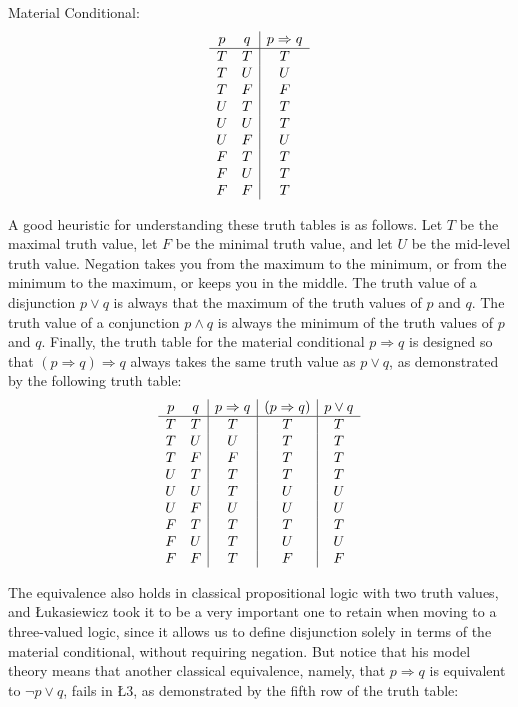 \documentclass[11pt]{article}
\theoremstyle{definition}
\theoremstyle{remark}
\begin{document}
\noindent
Material Conditional:
\[
\begin{array}{c c|c}
p & q & p \Rightarrow q \\
\hline
T & T & T \\
T & U & U \\
T & F & F \\
U & T & T \\
U & U & T \\
U & F & U \\
F & T & T \\
F & U & T \\
F & F & T \\
\end{array}
\]\par
\noindent
A good heuristic for understanding these truth tables is as follows. Let $T$ be the maximal truth value, let $F$ be the minimal truth value, and let $U$ be the mid-level truth value. Negation takes you from the maximum to the minimum, or from the minimum to the maximum, or keeps you in the middle. The truth value of a disjunction $p\vee q$ is always that the maximum of the truth values of $p$ and $q$. The truth value of a conjunction $p\wedge q$ is always the minimum of the truth values of $p$ and $q$. Finally, the truth table for the material conditional $p\Rightarrow q$ is designed so that $(p\Rightarrow q)\Rightarrow q$ always takes the same truth value as $p\vee q$, as demonstrated by the following truth table:
\noindent
\[
\begin{array}{c c|c|c|c}
p & q & p \Rightarrow q & (p \Rightarrow q) & p \lor q \\
\hline
T & T & T & T & T \\
T & U & U & T & T \\
T & F & F & T & T \\
U & T & T & T & T \\
U & U & T & U & U \\
U & F & U & U & U \\
F & T & T & T & T \\
F & U & T & U & U \\
F & F & T & F & F \\
\end{array}
\]\par
\noindent
The equivalence also holds in classical propositional logic with two truth values, and Łukasiewicz took it to be a very important one to retain when moving to a three-valued logic, since it allows us to define disjunction solely in terms of the material conditional, without requiring negation. But notice that his model theory means that another classical equivalence, namely, that $p\Rightarrow q$ is equivalent to $\neg p\vee q$, fails in Ł3, as demonstrated by the fifth row of the truth table:
\end{document}
